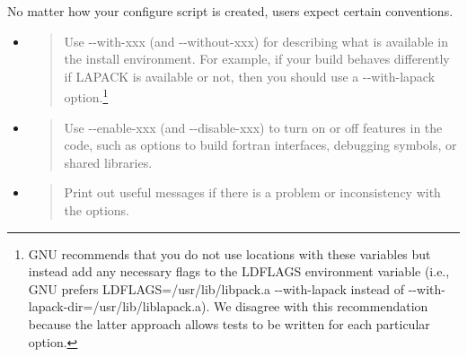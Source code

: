 \documentclass[]{article}
\begin{document}
No matter how your configure script is created, users expect certain
conventions.

\begin{itemize}
\item
  \begin{quote}
  Use -\/-with-xxx (and -\/-without-xxx) for describing what is
  available in the install environment. For example, if your build
  behaves differently if LAPACK is available or not, then you should use
  a -\/-with-lapack option.\footnote{GNU recommends that you do not use
    locations with these variables but instead add any necessary flags
    to the LDFLAGS environment variable (i.e., GNU prefers
    LDFLAGS=/usr/lib/libpack.a -\/-with-lapack instead of
    -\/-with-lapack-dir=/usr/lib/liblapack.a). We disagree with this
    recommendation because the latter approach allows tests to be
    written for each particular option.}
  \end{quote}
\item
  \begin{quote}
  Use -\/-enable-xxx (and -\/-disable-xxx) to turn on or off features in
  the code, such as options to build fortran interfaces, debugging
  symbols, or shared libraries.
  \end{quote}
\item
  \begin{quote}
  Print out useful messages if there is a problem or inconsistency with
  the options.
  \end{quote}
\end{itemize}
\end{document}
